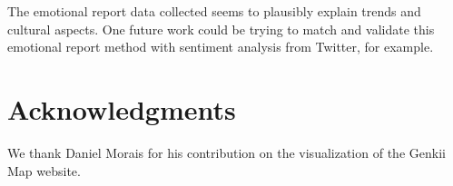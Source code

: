 \documentclass[letterpaper]{article}
\begin{document}
The emotional report data collected seems to plausibly explain trends and cultural aspects. One future work could be trying to match and validate this emotional report method with sentiment analysis from Twitter, for example. 



\section{ Acknowledgments}

We thank Daniel Morais for his contribution on the visualization of the Genkii Map website.

%
%
\end{document}
